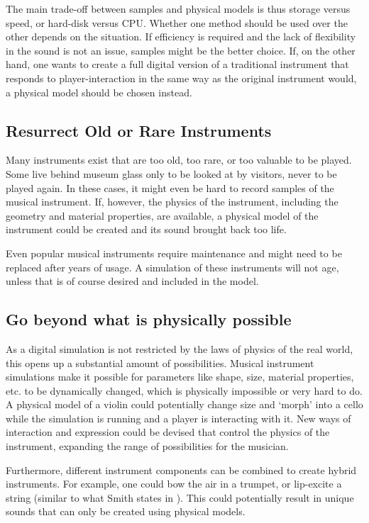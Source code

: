 The main trade-off between samples and physical models is thus storage versus speed, or hard-disk versus CPU. Whether one method should be used over the other depends on the situation. If efficiency is required and the lack of flexibility in the sound is not an issue, samples might be the better choice. If, on the other hand, one wants to create a full digital version of a traditional instrument that responds to player-interaction in the same way as the original instrument would, a physical model should be chosen instead.

\subsection{Resurrect Old or Rare Instruments}
Many instruments exist that are too old, too rare, or too valuable to be played. Some live behind museum glass only to be looked at by visitors, never to be played again. In these cases, it might even be hard to record samples of the musical instrument. If, however, the physics of the instrument, including the geometry and material properties, are available, a physical model of the instrument could be created and its sound brought back too life.

Even popular musical instruments require maintenance and might need to be replaced after years of usage. A simulation of these instruments will not age, unless that is of course desired and included in the model.

\subsection{Go beyond what is physically possible}\label{sec:impossible}
As a digital simulation is not restricted by the laws of physics of the real world, this opens up a substantial amount of possibilities.
Musical instrument simulations make it possible for parameters like shape, size, material properties, etc. to be dynamically changed, which is physically impossible or very hard to do. A physical model of a violin could potentially change size and `morph' into a cello while the simulation is running and a player is interacting with it. New ways of interaction and expression could be devised that control the physics of the instrument, expanding the range of possibilities for the musician. 

Furthermore, different instrument components can be combined to create hybrid instruments. For example, one could bow the air in a trumpet, or lip-excite a string (similar to what Smith states in \cite{Smith2010a}). This could potentially result in unique sounds that can only be created using physical models.

